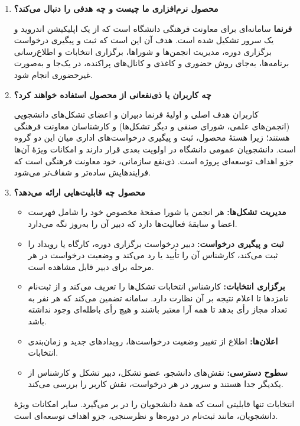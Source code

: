 \documentclass[a4paper,12pt]{article}
\newcommand{\q}[1]{\textcolor{brand}{\textbf{#1}}\par}
\begin{document}
\begin{enumerate}
	\item \q{محصول نرم‌افزاری ما چیست و چه هدفی را دنبال می‌کند؟}
	\textbf{فرنما} سامانه‌ای برای معاونت فرهنگی دانشگاه است که از یک اپلیکیشن اندروید و یک سرور تشکیل شده است. هدف آن این است که ثبت و پیگیری درخواست برگزاری دوره، مدیریت انجمن‌ها و شوراها، برگزاری انتخابات و اطلاع‌رسانی برنامه‌ها، به‌جای روش حضوری و کاغذی و کانال‌های پراکنده، در یک‌جا و به‌صورت غیرحضوری انجام شود.

        \vspace*{0.75cm}
	\item \q{چه کاربران یا ذی‌نفعانی از محصول استفاده خواهند کرد؟}
	کاربران هدف اصلی و اولیهٔ فرنما دبیران و اعضای تشکل‌های دانشجویی (انجمن‌های علمی، شورای صنفی و دیگر تشکل‌ها) و کارشناسان معاونت فرهنگی هستند؛ زیرا هستهٔ محصول، ثبت و پیگیری درخواست‌های اداری میان این دو گروه است. دانشجویان عمومی دانشگاه در اولویت بعدی قرار دارند و امکانات ویژهٔ آن‌ها جزو اهداف توسعه‌ای پروژه است. ذی‌نفع سازمانی، خود معاونت فرهنگی است که فرایندهایش ساده‌تر و شفاف‌تر می‌شود.

        \vspace*{0.75cm}
	\item \q{محصول چه قابلیت‌هایی ارائه می‌دهد؟}
	\begin{itemize}
		\item \textbf{مدیریت تشکل‌ها:} هر انجمن یا شورا صفحهٔ مخصوص خود را شامل فهرست اعضا و سابقهٔ فعالیت‌ها دارد که دبیر آن را به‌روز نگه می‌دارد.
		\item \textbf{ثبت و پیگیری درخواست:} دبیر درخواست برگزاری دوره، کارگاه یا رویداد را ثبت می‌کند، کارشناس آن را تأیید یا رد می‌کند و وضعیت درخواست در هر مرحله برای دبیر قابل مشاهده است.
		\item \textbf{برگزاری انتخابات:} کارشناس انتخابات تشکل‌ها را تعریف می‌کند و از ثبت‌نام نامزدها تا اعلام نتیجه بر آن نظارت دارد. سامانه تضمین می‌کند که هر نفر به تعداد مجاز رأی بدهد تا همه آرا معتبر باشند و هیچ رأی باطله‌ای وجود نداشته باشد.
		\item \textbf{اعلان‌ها:} اطلاع از تغییر وضعیت درخواست‌ها، رویدادهای جدید و زمان‌بندی انتخابات.
		\item \textbf{سطوح دسترسی:} نقش‌های دانشجو، عضو تشکل، دبیر تشکل و کارشناس از یکدیگر جدا هستند و سرور در هر درخواست، نقش کاربر را بررسی می‌کند.
	\end{itemize}
	انتخابات تنها قابلیتی است که همهٔ دانشجویان را در بر می‌گیرد. سایر امکانات ویژهٔ دانشجویان، مانند ثبت‌نام در دوره‌ها و نظرسنجی، جزو اهداف توسعه‌ای است.


\end{enumerate}
\end{document}
